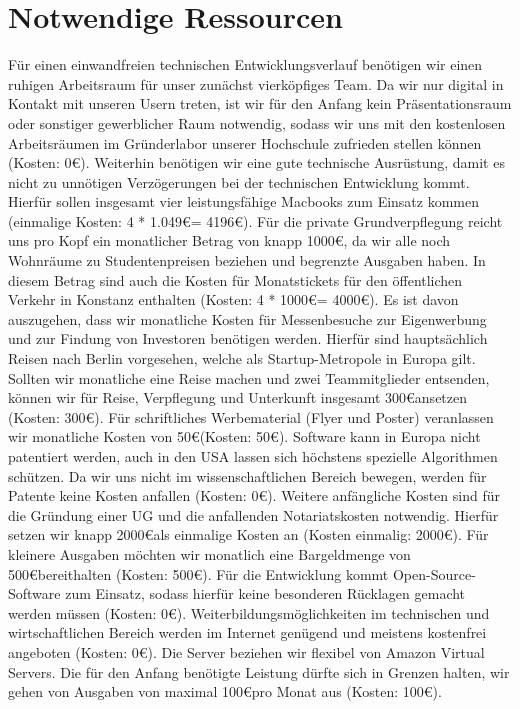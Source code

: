 \section{Notwendige Ressourcen}
Für einen einwandfreien technischen Entwicklungsverlauf benötigen wir einen ruhigen Arbeitsraum für unser zunächst vierköpfiges Team. Da wir nur digital in Kontakt mit unseren Usern treten, ist wir für den Anfang kein Präsentationsraum oder sonstiger gewerblicher Raum notwendig, sodass wir uns mit den kostenlosen Arbeitsräumen im Gründerlabor unserer Hochschule zufrieden stellen können (Kosten: 0\euro). 
Weiterhin benötigen wir eine gute technische Ausrüstung, damit es nicht zu unnötigen Verzögerungen bei der technischen Entwicklung kommt. Hierfür sollen insgesamt vier leistungsfähige Macbooks zum Einsatz kommen (einmalige Kosten: 4 * 1.049\euro = 4196\euro).
Für die private Grundverpflegung reicht uns pro Kopf ein monatlicher Betrag von knapp 1000\euro, da wir alle noch Wohnräume zu Studentenpreisen beziehen und begrenzte Ausgaben haben. In diesem Betrag sind auch die Kosten für Monatstickets für den öffentlichen Verkehr in Konstanz enthalten (Kosten: 4 * 1000\euro = 4000\euro).
Es ist davon auszugehen, dass wir monatliche Kosten für Messenbesuche zur Eigenwerbung und zur Findung von Investoren benötigen werden. Hierfür sind hauptsächlich Reisen nach Berlin vorgesehen, welche als Startup-Metropole in Europa gilt. Sollten wir monatliche eine Reise machen und zwei Teammitglieder entsenden, können wir für Reise, Verpflegung und Unterkunft insgesamt 300\euro ansetzen (Kosten: 300\euro).
Für schriftliches Werbematerial (Flyer und Poster) veranlassen wir monatliche Kosten von 50\euro (Kosten: 50\euro).
Software kann in Europa nicht patentiert werden, auch in den USA lassen sich höchstens spezielle Algorithmen schützen. Da wir uns nicht im wissenschaftlichen Bereich bewegen, werden für Patente keine Kosten anfallen (Kosten: 0\euro).
Weitere anfängliche Kosten sind für die Gründung einer UG und die anfallenden Notariatskosten notwendig. Hierfür setzen wir knapp 2000\euro als einmalige Kosten an (Kosten einmalig: 2000\euro).
Für kleinere Ausgaben möchten wir monatlich eine Bargeldmenge von 500\euro bereithalten (Kosten: 500\euro).
Für die Entwicklung kommt Open-Source-Software zum Einsatz, sodass hierfür keine besonderen Rücklagen gemacht werden müssen (Kosten: 0\euro).
Weiterbildungsmöglichkeiten im technischen und wirtschaftlichen Bereich werden im Internet genügend und meistens kostenfrei angeboten  (Kosten: 0\euro).
Die Server beziehen wir flexibel von Amazon Virtual Servers. Die für den Anfang benötigte Leistung dürfte sich in Grenzen halten, wir gehen von Ausgaben von maximal 100\euro pro Monat aus  (Kosten: 100\euro).

